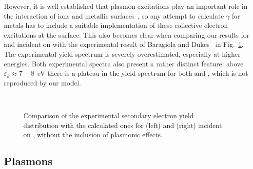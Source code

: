 \begin{refsection}
However, it is well established that plasmon excitations play an important 
role in the interaction of ions and metallic surfaces~\cite{Baragiola1996, 
Baragiola2001, Baragiola2007}, so any attempt to calculate $\gamma$ for metals 
has to include a suitable implementation of these collective electron excitations at
the surface. This also becomes clear when comparing our results 
for  and  incident on  with the experimental 
result of Baragiola and Dukes~\cite{Baragiola1996} in 
Fig.~\ref{quotas:fig-he_mg_noplasmon}. The experimental yield spectrum is 
severely overestimated, especially at higher energies. Both experimental 
spectra also present a rather distinct feature: above $\varepsilon_k \approx 
7-8$~\si{\electronvolt} there is a plateau in the yield spectrum for both 
 and , which is not reproduced by our model. 

\begin{figure}[ht] 
    \centering 
    \captionsetup{width=0.9\textwidth}
    \begin{subfigure}[t]{0.49\textwidth} 
        \centering 
         
        \vspace{-1em} 
        \caption{} 
    \end{subfigure}%
    ~  
    \begin{subfigure}[t]{0.49\textwidth} 
        \centering 
         
        \vspace{-1em} 
        \caption{} 
    \end{subfigure} 
\caption{Comparison of the experimental secondary electron yield distribution 
with the calculated ones for  (left) and  (right) incident on 
, without the inclusion of plasmonic effects.} 
\label{quotas:fig-he_mg_noplasmon} 
\end{figure} 
 
\subsection{Plasmons} \label{quotas:sec-plasmons} 
 

\end{refsection}
